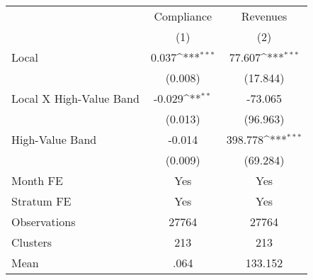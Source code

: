 {
\def\sym#1{\ifmmode^{#1}\else\(^{#1}\)\fi}
\begin{tabular}{l*{2}{c}}
\hline\hline
                &\multicolumn{1}{c}{Compliance}&\multicolumn{1}{c}{Revenues}\\
                &\multicolumn{1}{c}{(1)}         &\multicolumn{1}{c}{(2)}         \\
\hline
Local           &    0.037\sym{***}&   77.607\sym{***}\\
                &  (0.008)         & (17.844)         \\
Local X High-Value Band&   -0.029\sym{**} &  -73.065         \\
                &  (0.013)         & (96.963)         \\
High-Value Band &   -0.014         &  398.778\sym{***}\\
                &  (0.009)         & (69.284)         \\
Month FE        &      Yes         &      Yes         \\
Stratum FE      &      Yes         &      Yes         \\
\hline
Observations    &    27764         &    27764         \\
Clusters        &      213         &      213         \\
Mean            &     .064         &  133.152         \\
\hline\hline
\end{tabular}
}
